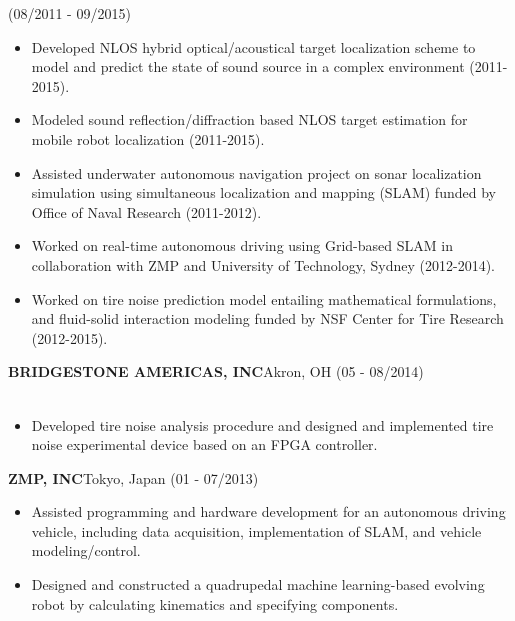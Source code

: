 \documentclass[11pt,letterpaper]{article}
\begin{document}
  \hfill {(08/2011 - 09/2015)}\\
  \begin{itemize}
  \item Developed NLOS hybrid optical/acoustical target localization scheme to model and predict the state of sound source in a complex environment (2011-2015).
  \item Modeled sound reflection/diffraction based NLOS target estimation for mobile robot localization (2011-2015).
  \item Assisted underwater autonomous navigation project on sonar localization simulation using simultaneous localization and mapping (SLAM) funded by Office of Naval Research (2011-2012).
  \item Worked on real-time autonomous driving using Grid-based SLAM in collaboration with ZMP and University of Technology, Sydney (2012-2014).
  \item Worked on tire noise prediction model entailing mathematical formulations, and fluid-solid interaction modeling funded by NSF Center for Tire Research (2012-2015).
  \end{itemize}

  \MakeUppercase{\bf Bridgestone Americas, Inc}\hfill{Akron, OH}{ (05 - 08/2014)}\\
  \\
  \begin{itemize}
  \item Developed tire noise analysis procedure and designed and implemented tire noise experimental device based on an FPGA controller.
  \end{itemize}

  \MakeUppercase{\bf ZMP, Inc}\hfill{Tokyo, Japan }{(01 - 07/2013)}\\
  \begin{itemize}
  \item Assisted programming and hardware development for an autonomous driving vehicle, including data acquisition, implementation of SLAM, and vehicle modeling/control.
  \item Designed and constructed a quadrupedal machine learning-based evolving robot by calculating kinematics and specifying components.
  \end{itemize}
\end{document}
